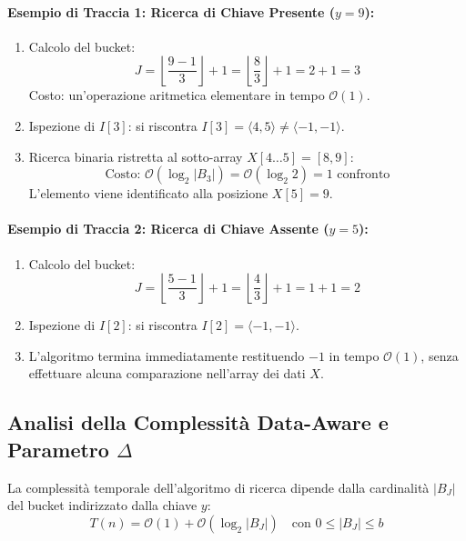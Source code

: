 \paragraph{Esempio di Traccia 1: Ricerca di Chiave Presente ($y = 9$):}
\begin{enumerate}
  \item Calcolo del bucket:
  \begin{equation}
    J = \left\lfloor \frac{9 - 1}{3} \right\rfloor + 1 = \left\lfloor \frac{8}{3} \right\rfloor + 1 = 2 + 1 = 3
  \end{equation}
  Costo: un'operazione aritmetica elementare in tempo $\mathcal{O}(1)$.
  \item Ispezione di $I[3]$: si riscontra $I[3] = \langle 4, 5 \rangle \neq \langle -1, -1 \rangle$.
  \item Ricerca binaria ristretta al sotto-array $X[4 \dots 5] = [8, 9]$:
  \begin{equation}
    \text{Costo: } \mathcal{O}(\log_2 |B_3|) = \mathcal{O}(\log_2 2) = 1 \text{ confronto}
  \end{equation}
  L'elemento viene identificato alla posizione $X[5] = 9$.
\end{enumerate}

\paragraph{Esempio di Traccia 2: Ricerca di Chiave Assente ($y = 5$):}
\begin{enumerate}
  \item Calcolo del bucket:
  \begin{equation}
    J = \left\lfloor \frac{5 - 1}{3} \right\rfloor + 1 = \left\lfloor \frac{4}{3} \right\rfloor + 1 = 1 + 1 = 2
  \end{equation}
  \item Ispezione di $I[2]$: si riscontra $I[2] = \langle -1, -1 \rangle$.
  \item L'algoritmo termina immediatamente restituendo $-1$ in tempo $\mathcal{O}(1)$, senza effettuare alcuna comparazione nell'array dei dati $X$.
\end{enumerate}

\FloatBarrier
\subsection{Analisi della Complessità Data-Aware e Parametro $\Delta$}
\label{subsec:analisi-complessita-data-aware}

La complessit\`a temporale dell'algoritmo di ricerca dipende dalla cardinalit\`a $|B_J|$ del bucket indirizzato dalla chiave $y$:
\begin{equation}
  T(n) = \mathcal{O}(1) + \mathcal{O}(\log_2 |B_J|) \quad \text{con } 0 \le |B_J| \le b
\end{equation}

